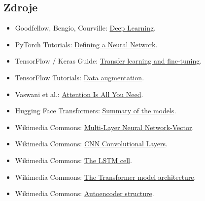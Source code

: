 \subsection{Zdroje}

\begin{itemize}
    \item Goodfellow, Bengio, Courville:
    \href{https://www.deeplearningbook.org/}{Deep Learning}.
    \item PyTorch Tutorials:
    \href{https://docs.pytorch.org/tutorials/recipes/recipes/defining\_a\_neural\_network.html}{Defining a
    Neural Network}.
    \item TensorFlow / Keras Guide:
    \href{https://www.tensorflow.org/guide/keras/transfer\_learning}{Transfer learning and fine-tuning}.
    \item TensorFlow Tutorials:
    \href{https://www.tensorflow.org/tutorials/images/data\_augmentation}{Data augmentation}.
    \item Vaswani et al.:
    \href{https://arxiv.org/abs/1706.03762}{Attention Is All You Need}.
    \item Hugging Face Transformers:
    \href{https://huggingface.co/docs/transformers/v4.16.2/en/model\_summary}{Summary of the models}.
    \item Wikimedia Commons:
    \href{https://commons.wikimedia.org/wiki/File:Multi-Layer\_Neural\_Network-Vector.svg}{Multi-Layer Neural
    Network-Vector}.
    \item Wikimedia Commons:
    \href{https://commons.wikimedia.org/wiki/File:CNN\_Convolutional\_Layers.svg}{CNN Convolutional Layers}.
    \item Wikimedia Commons:
    \href{https://commons.wikimedia.org/wiki/File:The\_LSTM\_cell.png}{The LSTM cell}.
    \item Wikimedia Commons:
    \href{https://commons.wikimedia.org/wiki/File:The-Transformer-model-architecture.png}{The Transformer model
    architecture}.
    \item Wikimedia Commons:
    \href{https://commons.wikimedia.org/wiki/File:Autoencoder\_structure.png}{Autoencoder structure}.
\end{itemize}

\newpage
